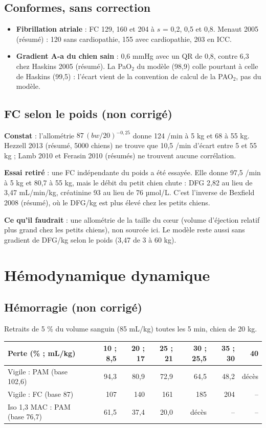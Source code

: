 \documentclass[10pt,a4paper]{article}
\begin{document}
\subsection{Conformes, sans correction}
\begin{itemize}
\item \textbf{Fibrillation atriale} : FC 129, 160 et 204 à $s$ = 0,2, 0,5 et 0,8. Menaut 2005 (résumé) : 120 sans cardiopathie, 155 avec cardiopathie, 203 en ICC.
\item \textbf{Gradient A-a du chien sain} : 0,6 mmHg avec un QR de 0,8, contre 6,3 chez Haskins 2005 (résumé). La PaO$_2$ du modèle (98,9) colle pourtant à celle de Haskins (99,5) : l'écart vient de la convention de calcul de la PAO$_2$, pas du modèle.
\end{itemize}

\subsection{FC selon le poids (non corrigé)}
\textbf{Constat} : l'allométrie $87\,(bw/20)^{-0{,}25}$ donne 124 /min à 5 kg et 68 à 55 kg. Hezzell 2013 (résumé, 5000 chiens) ne trouve que 10,5 /min d'écart entre 5 et 55 kg ; Lamb 2010 et Ferasin 2010 (résumés) ne trouvent aucune corrélation.

\textbf{Essai retiré} : une FC indépendante du poids a été essayée. Elle donne 97,5 /min à 5 kg et 80,7 à 55 kg, mais le débit du petit chien chute : DFG 2,82 au lieu de 3,47 mL/min/kg, créatinine 93 au lieu de 76 µmol/L. C'est l'inverse de Bexfield 2008 (résumé), où le DFG/kg est plus élevé chez les petits chiens.

\textbf{Ce qu'il faudrait} : une allométrie de la taille du cœur (volume d'éjection relatif plus grand chez les petits chiens), non sourcée ici. Le modèle reste aussi sans gradient de DFG/kg selon le poids (3,47 de 3 à 60 kg).

\section{Hémodynamique dynamique}
\subsection{Hémorragie (non corrigé)}
Retraits de 5 \% du volume sanguin (85 mL/kg) toutes les 5 min, chien de 20 kg.

\begin{center}\small
\begin{tabular}{lrrrrrr}
\toprule
Perte (\% ; mL/kg) & 10 ; 8,5 & 20 ; 17 & 25 ; 21 & 30 ; 25,5 & 35 ; 30 & 40\\
\midrule
Vigile : PAM (base 102,6) & 94,3 & 80,9 & 72,9 & 64,5 & 48,2 & décès\\
Vigile : FC (base 87) & 107 & 140 & 161 & 185 & 204 & --\\
Iso 1,3 MAC : PAM (base 76,7) & 61,5 & 37,4 & 20,0 & décès & -- & --\\
\bottomrule
\end{tabular}
\end{center}
\end{document}
